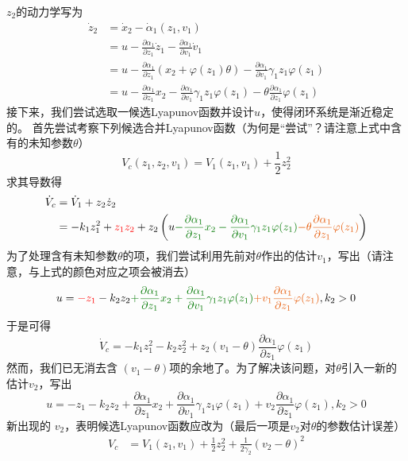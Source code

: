 $z_2$的动力学写为
  \begin{align*}
  \dot{z}_2 & = \dot{x}_2 - \dot{\alpha}_1 (z_1, v_1)\\
  & = u - \frac{\partial \alpha_1}{\partial z_1} \dot{z}_1 - \frac{\partial
  \alpha_1}{\partial v_1} \dot{v}_1\\
  & = u - \frac{\partial \alpha_1}{\partial z_1} (x_2 + \varphi (z_1)
  \theta) - \frac{\partial \alpha_1}{\partial v_1} \gamma_1 z_1 \varphi
  (z_1)\\
  & = u - \frac{\partial \alpha_1}{\partial z_1} x_2 - \frac{\partial
  \alpha_1}{\partial v_1} \gamma_1 z_1 \varphi (z_1) - \theta \frac{\partial
  \alpha_1}{\partial z_1} \varphi (z_1)
\end{align*}
接下来，我们尝试选取一候选Lyapunov函数并设计$u$，使得闭环系统是渐近稳定的。
首先尝试考察下列候选合并Lyapunov函数（为何是“尝试”？请注意上式中含有的未知参数$\theta$）
\[ V_c (z_1, z_2, v_1) = V_1 (z_1, v_1) + \frac{1}{2} z^2_2 \]
求其导数得
\begin{align*}
  \dot{V}_c & = \dot{V}_1 + z_2 \dot{z}_2\\
  & = - k_1 z^2_1 + \textcolor{red}{z_1 z_2} + z_2 \left( u \textcolor{structurecolor}{- \frac{\partial
  \alpha_1}{\partial z_1} x_2 - \frac{\partial \alpha_1}{\partial v_1}
  \gamma_1 z_1 \varphi (z_1)} \textcolor{second}{- \theta \frac{\partial \alpha_1}{\partial z_1}  \varphi (z_1)} \right)
\end{align*}
为了处理含有未知参数$\theta$的项，我们尝试利用先前对$\theta$作出的估计$v_1$，写出（请注意，与上式的颜色对应之项会被消去）
\[ u = \textcolor{red}{- z_1} - k_2z_2 \textcolor{structurecolor}{+ \frac{\partial \alpha_1}{\partial z_1} x_2 +
   \frac{\partial \alpha_1}{\partial v_1} \gamma_1 z_1 \varphi (z_1)} \textcolor{second}{+ v_1
   \frac{\partial \alpha_1}{\partial z_1} \varphi (z_1)}, k_2 > 0 \]
于是可得
\[ \dot{V}_c = - k_1 z^2_1 - k_2 z^2_2 + z_2 (v_1 - \theta) \frac{\partial
   \alpha_1}{\partial z_1} \varphi (z_1) \]
然而，我们已无消去含 $(v_1 - \theta)$项的余地了。为了解决该问题，对$\theta$引入一新的估计$v_2$，写出
\[ u = - z_1 - k_2z_2 + \frac{\partial \alpha_1}{\partial z_1} x_2 +
   \frac{\partial \alpha_1}{\partial v_1} \gamma_1 z_1 \varphi (z_1) + v_2
   \frac{\partial \alpha_1}{\partial z_1} \varphi (z_1), k_2 > 0 \]
新出现的 $v_2$，表明候选Lyapunov函数应改为（最后一项是$v_2$对$\theta$的参数估计误差）
\begin{align*}
  V_c & = V_1 (z_1, v_1) + \frac{1}{2} z^2_2 + \frac{1}{2 \gamma_2} (v_2 -
  \theta)^2
\end{align*}
